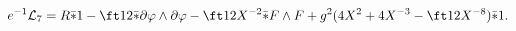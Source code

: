 \begin{equation}
e^{-1}{\cal L}_7 = R\bar *1 -\ft12 \bar*\partial\varphi\wedge\partial\varphi
-\ft12 X^{-2}\bar *F\wedge F+g^2(4X^2+4X^{-3}-\ft12 X^{-8})\bar*1.
\label{eq:d7n2lag2}
\end{equation}

